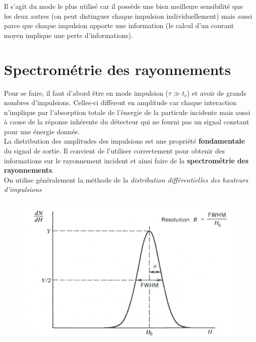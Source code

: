 	Il s'agit du mode le plus utilisé car il possède une bien 
	meilleure sensibilité que les deux autres (on peut distinguer
	chaque impulsion individuellement) mais aussi parce que chaque
	impulsion apporte une information (le calcul d'un courant 
	moyen implique une perte d'informations).
	
\section{Spectrométrie des rayonnements}%
Pour se faire, il faut d'abord être en mode impulsion ($\tau\gg
t_c$) et avoir de grands nombres d'impulsions. Celles-ci diffèrent
en amplitude car chaque interaction n'implique par l'absorption 
totale de l'énergie de la particule incidente mais aussi à cause
de la réponse inhérente du détecteur qui ne fourni pas un signal
constant pour une énergie donnée.\\

La distribution des amplitudes des impulsions est une propriété
\textbf{fondamentale} du signal de sortie. Il convient de 
l'utiliser correctement pour obtenir des informations sur le 
rayonnement incident et ainsi faire de la \textbf{spectrométrie
des rayonnements}.\\

On utilise généralement la méthode de la \textit{distribution 
différentielles des hauteurs d'impulsions}

	\begin{figure}
	\includegraphics[scale=0.3]{ch7/image3}
	\end{figure}\ 
 
